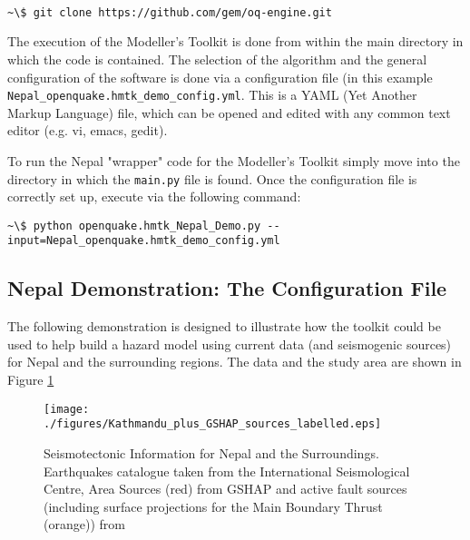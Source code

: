 \begin{Verbatim}[frame=single, commandchars=\\\{\}, fontsize=\scriptsize]

~\$ git clone https://github.com/gem/oq-engine.git

\end{Verbatim}


The execution of the Modeller's Toolkit is done from within the main directory in which the code is contained. The selection of the algorithm and the general configuration of the software is done via a configuration file (in this example \verb=Nepal_openquake.hmtk_demo_config.yml=. This is a YAML (Yet Another Markup Language) file, which can be opened and edited with any common text editor (e.g. vi, emacs, gedit).

To run the Nepal "wrapper" code for the Modeller's Toolkit simply move into the directory in which the \verb=main.py= file is found. Once the configuration file is correctly set up, execute via the following command:
\begin{Verbatim}[frame=single, commandchars=\\\{\}, fontsize=\scriptsize]
~\$ python openquake.hmtk_Nepal_Demo.py --input=Nepal_openquake.hmtk_demo_config.yml
\end{Verbatim}


\subsection{Nepal Demonstration: The Configuration File}

The following demonstration is designed to illustrate how the toolkit could be used to help build a hazard model using current data (and seismogenic sources) for Nepal and the surrounding regions. The data and the study area are shown in Figure \ref{fig:KathGSHAPLabel}

\begin{figure}[htbp]
	\centering
		\texttt{[image: ./figures/Kathmandu\_plus\_GSHAP\_sources\_labelled.eps]}
	\caption{Seismotectonic Information for Nepal and the Surroundings. Earthquakes catalogue taken from the International Seismological Centre, Area Sources (red) from GSHAP and active fault sources (including surface projections for the Main Boundary Thrust (orange)) from \cite{TaylorYin2009}}
	\label{fig:KathGSHAPLabel}
\end{figure}






